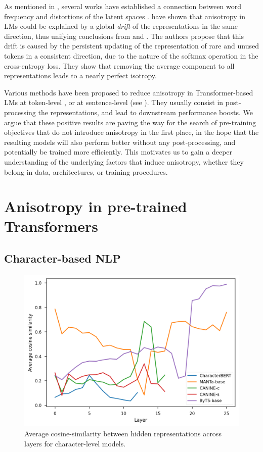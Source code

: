 As mentioned in , several works have established a connection between word frequency and distortions of the latent spaces \citep{yu-etal-2022-rare, puccetti-etal-2022-outlier,rajaee-pilehvar-2022-isotropy}. \citet{bis-etal-2021-much} have shown that anisotropy in LMs could be explained by a global \textit{drift} of the representations in the same direction, thus unifying conclusions from \citet{ethayarajh-2019-contextual} and \citet{gao2018representation}. The authors propose that this drift is caused by the persistent updating of the representation of rare and unused tokens in a consistent direction, due to the nature of the softmax operation in the cross-entropy loss. They show that removing the average component to all representations leads to a nearly perfect isotropy.

Various methods have been proposed to reduce anisotropy in Transformer-based LMs at token-level \citep{rajaee-pilehvar-2021-cluster, Wang2020Improving}, or at sentence-level \citep{gao-etal-2021-simcse, yan-etal-2021-consert,su2021whiteningsentencerepresentationsbetter} (see ). They usually consist in post-processing the representations, and lead to downstream performance boosts. We argue that these positive results are paving the way for the search of pre-training objectives that do not introduce anisotropy in the first place, in the hope that the resulting models will also perform better without any post-processing, and potentially be trained more efficiently. This motivates us to gain a deeper understanding of the underlying factors that induce anisotropy, whether they belong in data, architectures, or training procedures.



\section{Anisotropy in pre-trained Transformers}
\subsection{Character-based NLP}
\label{sec:charbased}
\begin{figure}[ht]
    \centering
     \includegraphics[width=0.5\columnwidth]{sources/part_1/anisotropy/imgs/cosine_char_based.png}
     \caption{Average cosine-similarity between hidden representations across layers for character-level models.}
     \label{fig:cos_char_aware}
\end{figure}

